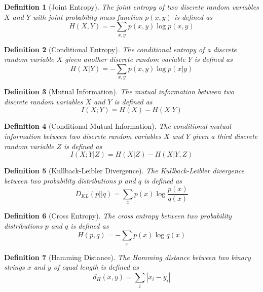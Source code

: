 \documentclass[11pt]{book}
\theoremstyle{boldStyle}
\newtheorem{definition}{Definition}[section]
\begin{document}
\begin{definition}[Joint Entropy]
The joint entropy of two discrete random variables $X$ and $Y$ with joint probability mass function $p(x,y)$ is defined as
\begin{equation}
    H(X,Y) = -\sum_{x,y} p(x,y) \log p(x,y)
\end{equation}
\end{definition}

\begin{definition}[Conditional Entropy]
The conditional entropy of a discrete random variable $X$ given another discrete random variable $Y$ is defined as
\begin{equation}
    H(X|Y) = -\sum_{x,y} p(x,y) \log p(x|y)
\end{equation}
\end{definition}

\begin{definition}[Mutual Information]
The mutual information between two discrete random variables $X$ and $Y$ is defined as
\begin{equation}
    I(X;Y) = H(X) - H(X|Y)
\end{equation}
\end{definition}

\begin{definition}[Conditional Mutual Information]
The conditional mutual information between two discrete random variables $X$ and $Y$ given a third discrete random variable $Z$ is defined as
\begin{equation}
    I(X;Y|Z) = H(X|Z) - H(X|Y,Z)
\end{equation}
\end{definition}

\begin{definition}[Kullback-Leibler Divergence]
The Kullback-Leibler divergence between two probability distributions $p$ and $q$ is defined as
\begin{equation}
    D_{KL}(p||q) = \sum_{x} p(x) \log \frac{p(x)}{q(x)}
\end{equation}
\end{definition}

\begin{definition}[Cross Entropy]
The cross entropy between two probability distributions $p$ and $q$ is defined as
\begin{equation}
    H(p,q) = -\sum_{x} p(x) \log q(x)
\end{equation}
\end{definition}

\begin{definition}[Hamming Distance]
The Hamming distance between two binary strings $x$ and $y$ of equal length is defined as
\begin{equation}
    d_H(x,y) = \sum_{i} |x_i - y_i|
\end{equation}
\end{definition}
\end{document}
